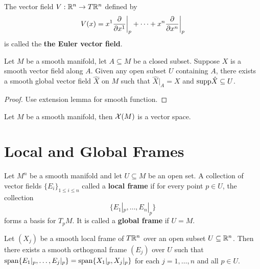 \begin{example} The vector field $V: \mathbb{R}^n \to T\mathbb{R}^n$ defined by 
    \[
        V(x) = x^1\frac{\partial}{\partial x^1}\bigg|_p + \dots + x^n\frac{\partial}{\partial x^n}\bigg|_p
    \]
is called the \textbf{the Euler vector field}.
    
\end{example}
\begin{lemma}
    Let $M$ be a smooth manifold, let $A \subseteq M$ be a closed subset. Suppose $X$ is a smooth vector field along $A$. Given any open subset $U$ containing $A$, there exists a smooth global vector field $\hat{X}$ on $M$ such that $\hat{X}|_A = X$ and $\mathrm{supp} \hat{X} \subseteq U$.
\end{lemma}
\begin{proof}
    Use extension lemma for smooth function.
\end{proof}
\begin{proposition}
    Let $M$ be a smooth manifold, then $\mathcal{X}(M)$ is a vector space.
\end{proposition}
\section{Local and Global Frames}
\begin{definition}
    Let $M^n$ be a smooth manifold and let $U \subseteq M$ be an open set. A collection of vector fields $\{E_i\}_{1 \leq i \leq n}$ called a \textbf{local frame} if for every point $p \in U$, the collection
    \[
        \{E_1|_p,\dots, E_n|_p\}
    \]
    forms a basis for $T_pM$. It is called a \textbf{global frame} if $U = M$.
\end{definition}
\begin{lemma} Let $(X_j)$ be a smooth local frame of $T\mathbb{R}^n$ over an open subset $U \subseteq \mathbb{R}^n$. Then there exists a smooth orthogonal frame $(E_j)$ over $U$ such that $\mathrm{span}\{E_1|_p,\dots,E_j|_p\} = \mathrm{span} \{X_1|_p,X_j|_p\}$ for each $j = 1,\dots, n$ and all $p \in U$.

\end{lemma}
